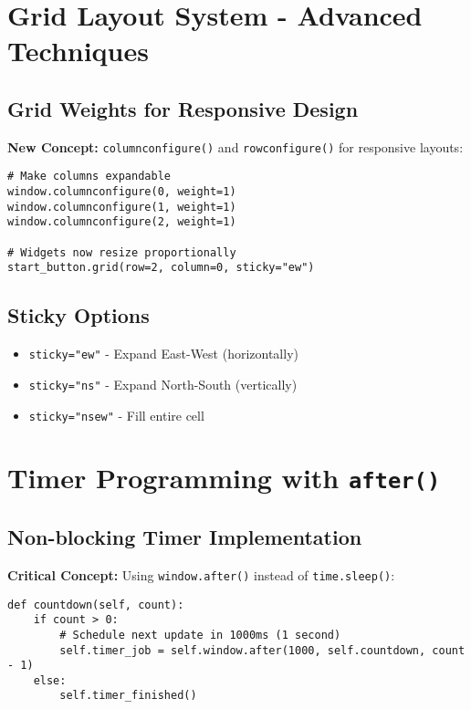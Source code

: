 \documentclass[12pt]{article}
\begin{document}
\section{Grid Layout System - Advanced Techniques}

\subsection{Grid Weights for Responsive Design}
\textbf{New Concept:} \texttt{columnconfigure()} and \texttt{rowconfigure()} for responsive layouts:

\begin{lstlisting}
# Make columns expandable
window.columnconfigure(0, weight=1)
window.columnconfigure(1, weight=1) 
window.columnconfigure(2, weight=1)

# Widgets now resize proportionally
start_button.grid(row=2, column=0, sticky="ew")
\end{lstlisting}

\subsection{Sticky Options}
\begin{itemize}
    \item \texttt{sticky="ew"} - Expand East-West (horizontally)
    \item \texttt{sticky="ns"} - Expand North-South (vertically)  
    \item \texttt{sticky="nsew"} - Fill entire cell
\end{itemize}

\section{Timer Programming with \texttt{after()}}

\subsection{Non-blocking Timer Implementation}
\textbf{Critical Concept:} Using \texttt{window.after()} instead of \texttt{time.sleep()}:

\begin{lstlisting}
def countdown(self, count):
    if count > 0:
        # Schedule next update in 1000ms (1 second)
        self.timer_job = self.window.after(1000, self.countdown, count - 1)
    else:
        self.timer_finished()
\end{lstlisting}
\end{document}

